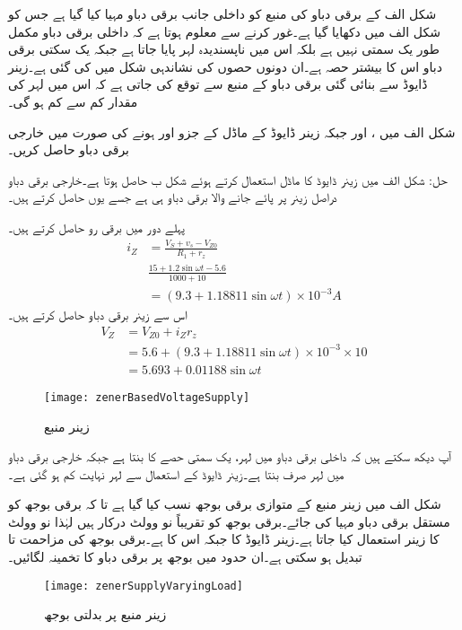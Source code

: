 

شکل  الف  کے برقی دباو کی منبع کو داخلی جانب برقی دباو مہیا کیا گیا ہے جس کو شکل  الف میں دکھایا گیا ہے۔غور کرنے سے معلوم ہوتا ہے کہ داخلی برقی دباو مکمل طور یک سمتی نہیں ہے بلکہ اس میں ناپسندیدہ لہر  پایا جاتا ہے جبکہ یک سکتی برقی دباو   اس کا بیشتر حصہ ہے۔ان دونوں حصوں کی نشاندہی شکل میں کی گئی ہے۔زینر ڈایوڈ سے بنائی گئی برقی دباو کے منبع سے توقع کی جاتی ہے کہ اس میں لہر کی مقدار کم سے کم ہو گی۔

شکل  الف میں ،  اور  جبکہ زینر ڈایوڈ کے ماڈل کے جزو  اور  ہونے کی صورت میں خارجی برقی دباو  حاصل کریں۔

حل:	شکل  الف میں زینر ڈایوڈ کا ماڈل استعمال کرتے ہوئے شکل  ب حاصل ہوتا ہے۔خارجی برقی دباو دراصل زینر پر پائے جانے والا برقی دباو  ہی ہے جسے یوں حاصل کرتے ہیں۔

پہلے دور میں برقی رو حاصل کرتے ہیں۔
\begin{align*}
i_Z&=\frac{V_S+v_s-V_{Z0}}{R_1+r_z}\\
&\frac{15+1.2 \sin \omega t -5.6}{1000+10}\\
&=\left (9.3+1.18811 \sin \omega t \right ) \times 10^{-3} A
\end{align*}
اس سے زینر برقی دباو حاصل کرتے ہیں۔
\begin{align*}
V_Z&=V_{Z0}+i_Z r_z\\
&=5.6+\left (9.3+1.18811 \sin \omega t \right ) \times 10^{-3} \times 10\\
&=5.693+0.01188 \sin \omega t
\end{align*}
%
\begin{figure}
\centering
\texttt{[image: zenerBasedVoltageSupply]}
\caption{زینر منبع}
\label{شکل_زینر_منبع}
\end{figure}
آپ دیکھ سکتے ہیں کہ داخلی برقی دباو میں لہر، یک سمتی حصے کا    بنتا ہے جبکہ خارجی برقی دباو میں لہر صرف   بنتا ہے۔زینر ڈایوڈ کے استعمال سے لہر نہایت کم ہو گئی ہے۔

شکل  الف میں زینر منبع کے متوازی برقی بوجھ  نسب کیا گیا ہے تا کہ برقی بوجھ کو مستقل برقی دباو مہیا کی جائے۔برقی بوجھ کو تقریباً نو وولٹ درکار ہیں لہٰذا نو وولٹ کا زینر استعمال کیا جاتا ہے۔زینر ڈایوڈ کا  جبکہ اس کا  ہے۔برقی بوجھ کی مزاحمت  تا  تبدیل ہو سکتی ہے۔ان حدود میں بوجھ پر برقی دباو  کا تخمینہ لگائیں۔
\begin{figure}
\centering
\texttt{[image: zenerSupplyVaryingLoad]}
\caption{زینر منبع پر بدلتی بوجھ}
\label{شکل_زینر_منبع_بدلتا_بار}
\end{figure}

